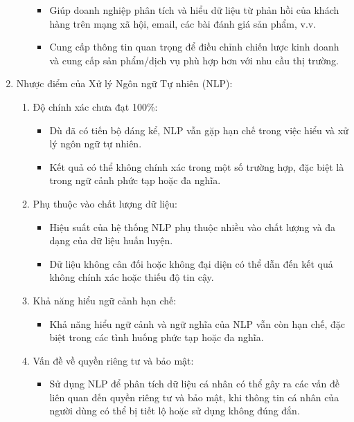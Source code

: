 \begin{enumerate}
\begin{enumerate}
        \begin{itemize}
            \item Giúp doanh nghiệp phân tích và hiểu dữ liệu từ phản hồi của khách hàng trên mạng xã hội, email, các bài đánh giá sản phẩm, v.v.
            \item Cung cấp thông tin quan trọng để điều chỉnh chiến lược kinh doanh và cung cấp sản phẩm/dịch vụ phù hợp hơn với nhu cầu thị trường.
        \end{itemize}
    \end{enumerate}
    \item Nhược điểm của Xử lý Ngôn ngữ Tự nhiên (NLP):
    \begin{enumerate}
        \item Độ chính xác chưa đạt 100\%:
        \begin{itemize}
            \item Dù đã có tiến bộ đáng kể, NLP vẫn gặp hạn chế trong việc hiểu và xử lý ngôn ngữ tự nhiên.
             \item Kết quả có thể không chính xác trong một số trường hợp, đặc biệt là trong ngữ cảnh phức tạp hoặc đa nghĩa.
        \end{itemize}
        \item Phụ thuộc vào chất lượng dữ liệu:
        \begin{itemize}
            \item Hiệu suất của hệ thống NLP phụ thuộc nhiều vào chất lượng và đa dạng của dữ liệu huấn luyện.
            \item Dữ liệu không cân đối hoặc không đại diện có thể dẫn đến kết quả không chính xác hoặc thiếu độ tin cậy.
        \end{itemize}
        \item Khả năng hiểu ngữ cảnh hạn chế:
        \begin{itemize}
            \item Khả năng hiểu ngữ cảnh và ngữ nghĩa của NLP vẫn còn hạn chế, đặc biệt trong các tình huống phức tạp hoặc đa nghĩa.
        \end{itemize}
        \item Vấn đề về quyền riêng tư và bảo mật:
        \begin{itemize}
            \item Sử dụng NLP để phân tích dữ liệu cá nhân có thể gây ra các vấn đề liên quan đến quyền riêng tư và bảo mật, khi thông tin cá nhân của người dùng có thể bị tiết lộ hoặc sử dụng không đúng đắn.
        \end{itemize}
    \end{enumerate}
    
\end{enumerate}
